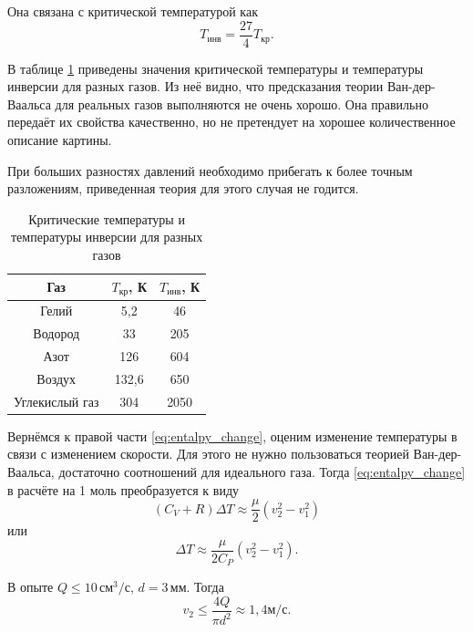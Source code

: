 \documentclass[12pt]{article}
\begin{document}
	Она связана с критической температурой как
	\begin{equation}
	\label{eq:T_inv&cr}
	T_\text{инв}=\frac{27}{4}T_\text{кр}.
	\end{equation}
	
	В таблице \ref{tbl:tinv&tcr} приведены значения критической температуры и температуры инверсии для разных газов. Из неё видно, что предсказания теории Ван-дер-Ваальса для реальных газов выполняются не очень хорошо. Она правильно передаёт их свойства качественно, но не претендует на хорошее количественное описание картины.
	
	При больших разностях давлений необходимо прибегать к более точным разложениям, приведенная теория для этого случая не годится.
	
	\begin{table}
	\caption{Критические температуры и температуры инверсии для разных газов}
	\label{tbl:tinv&tcr}
	\begin{center}
	\begin{tabular}{|c|c|c|}
	\hline
	Газ & $T_\text{кр}$, К & $T_\text{инв}$, К \\
	\hline
	Гелий & 5,2 & 46 \\
	Водород & 33 & 205 \\
	Азот & 126 & 604 \\
	Воздух & 132,6 & 650 \\
	Углекислый газ & 304 & 2050 \\
	\hline
	\end{tabular}
	\end{center}
	\end{table}
	
	Вернёмся к правой части \eqref{eq:entalpy_change}, оценим изменение температуры в связи с изменением скорости. Для этого не нужно пользоваться теорией Ван-дер-Ваальса, достаточно соотношений для идеального газа. Тогда \eqref{eq:entalpy_change} в расчёте на 1 моль преобразуется к виду
	\begin{equation}
	\label{eq:dT_vel}
	\left( C_V + R \right) \Delta T \approx \frac{\mu}{2} \left( v_2^2-v_1^2 \right)
	\end{equation}
	или
	\begin{equation}
	\label{eq:dT_vel_final}
	\Delta T \approx \frac{\mu}{2C_P} \left( v_2^2-v_1^2 \right).
	\end{equation}
	
	В опыте $Q \leqslant 10 \,\text{см}^3/ \text{с}$, $d=3\,\text{мм}$. Тогда
	\begin{equation}
	\label{eq:vel2_approx}
	v_2 \leqslant \frac{4Q}{\pi d^2} \approx 1{,}4 \text{м}/\text{с}.
	\end{equation}
	
\end{document}
